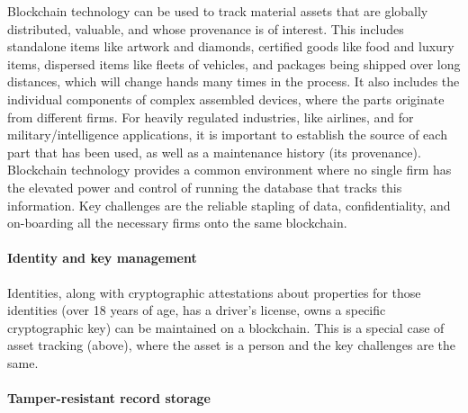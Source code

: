 Blockchain technology can be used to track material assets that are globally distributed, valuable, and whose provenance is of interest. This includes standalone items like artwork and diamonds, certified goods like food and luxury items, dispersed items like fleets of vehicles, and packages being shipped over long distances, which will change hands many times in the process. 
It also includes the individual components of complex assembled devices, where the parts originate from different firms. 
For heavily regulated industries, like airlines, and for military/intelligence applications, it is important to establish the source of each part that has been used, as well as a maintenance history (\ie its provenance).
%
Blockchain technology provides a common environment where no single firm has the elevated power and control of running the database that tracks this information. Key challenges are the reliable stapling of data, confidentiality, and on-boarding all the necessary firms onto the same blockchain.  

\paragraph{Identity and key management}

Identities, along with cryptographic attestations about properties for those identities (\eg over 18 years of age, has a driver's license, owns a specific cryptographic key) can be maintained on a blockchain. This is a special case of asset tracking (above), where the asset is a person and the key challenges are the same.

\paragraph{Tamper-resistant record storage}

